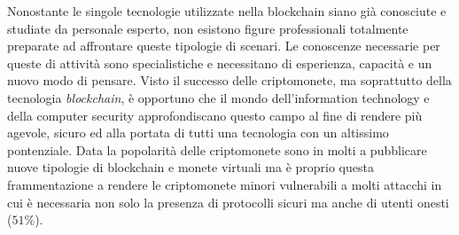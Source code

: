 Nonostante le singole tecnologie utilizzate nella blockchain siano già conosciute e studiate da personale esperto, non esistono figure professionali totalmente preparate ad affrontare queste tipologie di scenari. Le conoscenze necessarie per queste di attività sono specialistiche e necessitano di esperienza, capacità e un nuovo modo di pensare. Visto il successo delle criptomonete, ma soprattutto della tecnologia \textit{blockchain}, è opportuno che il mondo dell'information technology e della computer security approfondiscano questo campo al fine di rendere più agevole, sicuro ed alla portata di tutti una tecnologia con un altissimo pontenziale.\newline
Data la popolarità delle criptomonete sono in molti a pubblicare nuove tipologie di blockchain e monete virtuali ma è proprio questa frammentazione a rendere le criptomonete minori vulnerabili a molti attacchi in cui è necessaria non solo la presenza di protocolli sicuri ma anche di utenti onesti ($51\%$).



